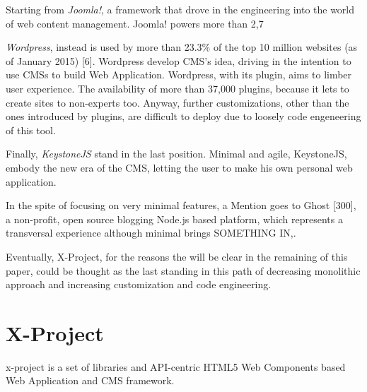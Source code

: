 \documentclass{sig-alternate}
\begin{document}
Starting from \emph{Joomla!}, a framework that drove in the engineering into the world of web content management. Joomla! powers more than 2,7%




\emph{Wordpress}, instead is used by more than 23.3\% of the top 10 million websites (as of January 2015) [6]. Wordpress develop CMS’s idea, driving in the intention to use CMSs to build Web Application. Wordpress, with its plugin, aims to limber user experience. The availability of more than 37,000 plugins, because it lets to create sites to non-experts too.
Anyway, further customizations, other than the ones introduced by plugins, are difficult to deploy due to loosely code engeneering of this tool.


Finally, \emph{KeystoneJS} stand in the last position. Minimal and agile, KeystoneJS, embody the new era of the CMS, letting the user to make his own personal web application.


In the spite of focusing on very minimal features, a Mention goes to Ghost \cite{ghost}[300], a non-profit, open source blogging Node.js based platform, which represents a transversal experience although minimal brings SOMETHING IN,.


Eventually, X-Project, for the reasons the will be clear in the remaining of this paper, could be thought as the last standing in this path of decreasing monolithic approach and increasing customization and code engineering.

















\section{X-Project}
x-project is a set of libraries and API-centric HTML5 Web Components based Web Application and CMS framework.
\end{document}
